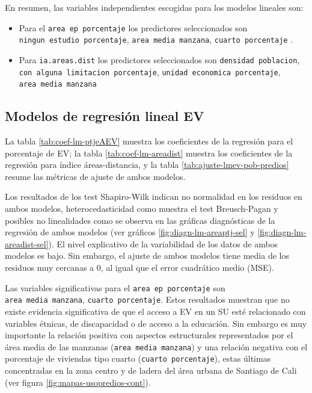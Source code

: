 \documentclass[12pt,a4paper,openany]{book}
\theoremstyle{definition}
\theoremstyle{definition}
\theoremstyle{definition}
\theoremstyle{remark}
\begin{document}
En resumen, las variables independientes escogidas para los modelos
lineales son:

\begin{itemize}
\item
  Para el \texttt{area\ ep\ porcentaje} los predictores seleccionados
  son \texttt{ningun\ estudio\ porcentaje},
  \texttt{area\ media\ manzana}, \texttt{cuarto\ porcentaje} .
\item
  Para \texttt{ia.areas.dist} los predictores seleccionados son
  \texttt{densidad\ poblacion},
  \texttt{con\ alguna\ limitacion\ porcentaje},
  \texttt{unidad\ economica\ porcentaje}, \texttt{area\ media\ manzana}
\end{itemize}

\subsection{Modelos de regresión lineal
EV}\label{modelos-de-regresion-lineal-ev}

La tabla \ref{tab:coef-lm-ptjeAEV} muestra los coeficientes de la
regresión para el porcentaje de EV; la tabla \ref{tab:coef-lm-areadist}
muestra los coeficientes de la regresión para índice áreas-distancia, y
la tabla \ref{tab:ajuste-lmev-pob-predios} resume las métricas de ajuste
de ambos modelos.

Los resultados de los test Shapiro-Wilk indican no normalidad en los
residuos en ambos modelos, heterocedasticidad como muestra el test
Breusch-Pagan y posibles no linealidades como se observa en las gráficas
diagnósticas de la regresión de ambos modelos (ver gráficos
\ref{fig:diagn-lm-areaptj-sel} y \ref{fig:diagn-lm-areadist-sel}). El
nivel explicativo de la variabilidad de los datos de ambos modelos es
bajo. Sin embargo, el ajuste de ambos modelos tiene media de los
residuos muy cercanas a 0, al igual que el error cuadrático medio (MSE).

Las variables significativas para el \texttt{area\ ep\ porcentaje} son
\texttt{area\ media\ manzana}, \texttt{cuarto\ porcentaje}. Estos
resultados muestran que no existe evidencia significativa de que el
acceso a EV en un SU esté relacionado con variables étnicas, de
discapacidad o de acceso a la educación. Sin embargo es muy importante
la relación positiva con aspectos estructurales representados por el
área media de las manzanas (\texttt{area\ media\ manzana}) y una
relación negativa con el porcentaje de viviendas tipo cuarto
(\texttt{cuarto\ porcentaje}), estas últimas concentradas en la zona
centro y de ladera del área urbana de Santiago de Cali (ver figura
\ref{fig:mapas-usopredios-cont}).
\end{document}
